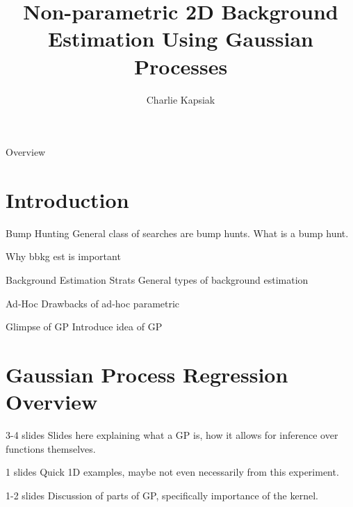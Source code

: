 \documentclass[10pt]{beamer}
\author{Charlie Kapsiak}
\title{Non-parametric 2D Background Estimation Using Gaussian Processes}
\begin{document}
\begin{frame}
  \maketitle
  
\end{frame}

\begin{frame}{Overview}

\end{frame}

\section{Introduction}
\label{sec:introduction}


\begin{frame}{Bump Hunting}
  General class of searches are bump hunts. What is a bump hunt.

  Why bbkg est is important
\end{frame}

\begin{frame}{Background Estimation Strats}
  General types of background estimation
\end{frame}


\begin{frame}{Ad-Hoc}
  Drawbacks of ad-hoc parametric
\end{frame}

\begin{frame}{Glimpse of GP}
  Introduce idea of GP
\end{frame}

\section{Gaussian Process Regression Overview}
\label{sec:gauss-proc-regr}

\begin{frame}{}
  3-4 slides
  Slides here explaining what a GP is, how it allows for inference over functions themselves. 
\end{frame}

\begin{frame}{}
  1 slides
   Quick 1D examples, maybe not even necessarily from this experiment.  
\end{frame}

\begin{frame}{}
  1-2 slides
  Discussion of parts of GP, specifically importance of the kernel.
\end{frame}
\end{document}
